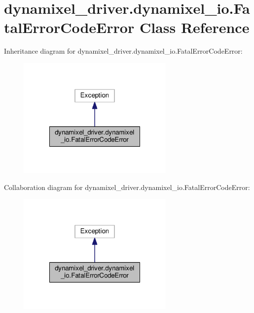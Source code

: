 \hypertarget{classdynamixel__driver_1_1dynamixel__io_1_1_fatal_error_code_error}{}\section{dynamixel\+\_\+driver.\+dynamixel\+\_\+io.\+Fatal\+Error\+Code\+Error Class Reference}
\label{classdynamixel__driver_1_1dynamixel__io_1_1_fatal_error_code_error}


Inheritance diagram for dynamixel\+\_\+driver.\+dynamixel\+\_\+io.\+Fatal\+Error\+Code\+Error\+:
\nopagebreak
\begin{figure}[H]
\begin{center}
\leavevmode
\includegraphics[width=216pt]{d5/df3/classdynamixel__driver_1_1dynamixel__io_1_1_fatal_error_code_error__inherit__graph}
\end{center}
\end{figure}


Collaboration diagram for dynamixel\+\_\+driver.\+dynamixel\+\_\+io.\+Fatal\+Error\+Code\+Error\+:
\nopagebreak
\begin{figure}[H]
\begin{center}
\leavevmode
\includegraphics[width=216pt]{d1/d76/classdynamixel__driver_1_1dynamixel__io_1_1_fatal_error_code_error__coll__graph}
\end{center}
\end{figure}
